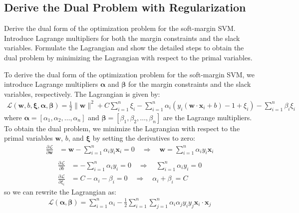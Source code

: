 \subsection{Derive the Dual Problem with Regularization}
Derive the dual form of the optimization problem for the soft-margin SVM. Introduce Lagrange multipliers for both the margin constraints and the slack variables. Formulate the Lagrangian and show the detailed steps to obtain the dual problem by minimizing the Lagrangian with respect to the primal variables.
\begin{qsolve}
    \begin{qsolve}[]
        To derive the dual form of the optimization problem for the soft-margin SVM, we introduce Lagrange multipliers $\boldsymbol{\alpha}$ and $\boldsymbol{\beta}$ for the margin constraints and the slack variables, respectively. The Lagrangian is given by:
        \begin{align*}
            \mathcal{L}(\mathbf{w}, b, \boldsymbol{\xi}, \boldsymbol{\alpha}, \boldsymbol{\beta}) = \frac{1}{2} \|\mathbf{w}\|^2 + C \sum_{i=1}^{n} \xi_i - \sum_{i=1}^{n} \alpha_i(y_i(\mathbf{w} \cdot \mathbf{x}_i + b) - 1 + \xi_i) - \sum_{i=1}^{n} \beta_i \xi_i
        \end{align*}
        where $\boldsymbol{\alpha} = [\alpha_1, \alpha_2, \ldots, \alpha_n]$ and $\boldsymbol{\beta} = [\beta_1, \beta_2, \ldots, \beta_n]$ are the Lagrange multipliers. To obtain the dual problem, we minimize the Lagrangian with respect to the primal variables $\mathbf{w}$, $b$, and $\boldsymbol{\xi}$ by setting the derivatives to zero:
        \begin{align*}
            \frac{\partial \mathcal{L}}{\partial \mathbf{w}} & = \mathbf{w} - \sum_{i=1}^{n} \alpha_i y_i \mathbf{x}_i = 0 \quad \Rightarrow \quad \mathbf{w} = \sum_{i=1}^{n} \alpha_i y_i \mathbf{x}_i \\
        \end{align*}
        \splitqsolve[\splitqsolve]
        \begin{align*} 
            \frac{\partial \mathcal{L}}{\partial b} & = -\sum_{i=1}^{n} \alpha_i y_i = 0 \quad \Rightarrow \quad \sum_{i=1}^{n} \alpha_i y_i = 0 \\
            \frac{\partial \mathcal{L}}{\partial \xi_i} & = C - \alpha_i - \beta_i = 0 \quad \Rightarrow \quad \alpha_i + \beta_i = C
        \end{align*}
        so we can rewrite the Lagrangian as:
        \begin{align*}
            \mathcal{L}(\boldsymbol{\alpha}, \boldsymbol{\beta}) = \sum_{i=1}^{n} \alpha_i - \frac{1}{2} \sum_{i=1}^{n} \sum_{j=1}^{n} \alpha_i \alpha_j y_i y_j \mathbf{x}_i \cdot \mathbf{x}_j

\end{align*}
\end{qsolve}
\end{qsolve}
